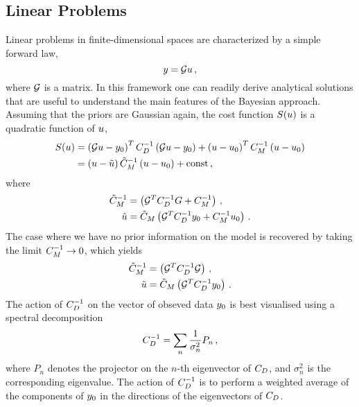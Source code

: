 \subsection{Linear Problems}
\label{sec:LinProbs}

Linear problems in finite-dimensional spaces are characterized by a simple forward law, 
\begin{equation}
  \label{eq:MatrixG}
  y = \mathcal{G} u\, ,
\end{equation}
where $\mathcal{G}$ is a matrix. In this framework one can readily  derive
analytical solutions that are useful to understand the main features of the
Bayesian approach. Assuming that the priors are Gaussian again, the cost
function $S(u)$ is a quadratic function of $u$,
\begin{align}
  \label{eq:CostLinGauss}
  S(u) &= 
  \left(\mathcal{G} u - y_0 \right)^T C_{D}^{-1} 
  \left(\mathcal{G} u - y_0 \right) + 
  \left( u - u_0 \right)^T C_M^{-1} \left(u - u_0 \right) \\
  &= 
  \left(u - \tilde{u}\right) \tilde{C}_M^{-1}
  \left(u - u_0\right) + \mathrm{const}\, ,
\end{align} 
where
\begin{align}
  \label{eq:PostParams}
  \tilde{C}_M^{-1} &= 
  \left(
    \mathcal{G}^T C_{D}^{-1} G + C_M^{-1}
  \right)\, , \\
  \tilde{u} &=
  \tilde{C}_M  \left(
    \mathcal{G}^T C_{D}^{-1} y_0 + C_M^{-1} u_0
  \right)\, .
\end{align}
The case where we have no prior information on the model is recovered by taking
the limit $C_M^{-1} \to 0$, which yields
\begin{align}
  \label{eq:NoPriorLinModel}
  \tilde{C}_M^{-1} &= 
  \left(
    \mathcal{G}^T C_{D}^{-1} \mathcal{G}
  \right)\, , \\
  \tilde{u} &=
  \tilde{C}_M  \left(
    \mathcal{G}^T C_{D}^{-1} y_0 
  \right)\, .
\end{align}
The action of $C_{D}^{-1}$ on the vector of obseved data $y_0$ is best visualised using a spectral decomposition
\begin{equation}
  \label{eq:CDSpecDec}
  C_{D}^{-1} = \sum_n \frac{1}{\sigma_n^2} P_n\, ,
\end{equation}
where $P_n$ denotes the projector on the $n$-th eigenvector of $C_{D}$, and
$\sigma_n^2$ is the corresponding eigenvalue. The action of $C_{D}^{-1}$ is to
perform a weighted average of the components of $y_0$ in the directions of the
eigenvectors of $C_{D}$.

